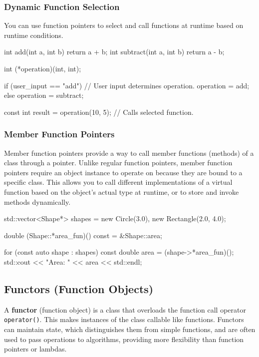 \subsubsection{Dynamic Function Selection}

You can use function pointers to select and call functions at runtime based on runtime conditions.

\begin{codeblock}[language=C++, numbers=none]
int add(int a, int b) { return a + b; }
int subtract(int a, int b) { return a - b; }

int (*operation)(int, int);

if (user_input == "add") { // User input determines operation.
    operation = add;
} else {
    operation = subtract;
}

const int result = operation(10, 5); // Calls selected function.
\end{codeblock}

\subsubsection{Member Function Pointers}

Member function pointers provide a way to call member functions (methods) of a class through a pointer. Unlike regular function pointers, member function pointers require an object instance to operate on because they are bound to a specific class. This allows you to call different implementations of a virtual function based on the object's actual type at runtime, or to store and invoke methods dynamically.

\begin{codeblock}[language=C++, numbers=none]
std::vector<Shape*> shapes = {new Circle(3.0), new Rectangle(2.0, 4.0)};

double (Shape::*area_fun)() const = &Shape::area;

for (const auto shape : shapes) {
    const double area = (shape->*area_fun)();
    std::cout << "Area: " << area << std::endl;
}
\end{codeblock}

\subsection{Functors (Function Objects)}

A \textbf{functor} (function object) is a class that overloads the function call operator \texttt{operator()}. This makes instances of the class callable like functions. Functors can maintain state, which distinguishes them from simple functions, and are often used to pass operations to algorithms, providing more flexibility than function pointers or lambdas.

